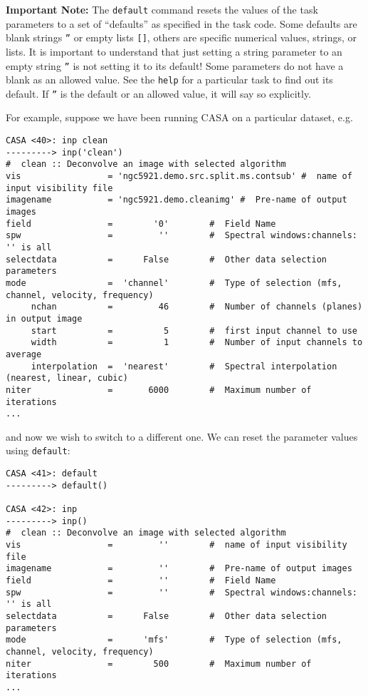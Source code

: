 {\bf Important Note:} The {\tt default} command resets the values
of the task parameters to a set of ``defaults'' as specified in
the task code.  Some defaults are blank strings {\tt ''} or 
empty lists {\tt []}, others are specific numerical values, strings,
or lists.  It is important to understand that just setting a string
parameter to an empty string {\tt ''} is not setting it to its 
default!  Some parameters do not have a blank as an allowed value.
See the {\tt help} for a particular task to find out its default.
If {\tt ''} is the default or an allowed value, it will say so
explicitly.

For example, suppose we have been running CASA on a particular
dataset, e.g.
\small
\begin{verbatim}
CASA <40>: inp clean
---------> inp('clean')
#  clean :: Deconvolve an image with selected algorithm
vis                 = 'ngc5921.demo.src.split.ms.contsub' #  name of input visibility file
imagename           = 'ngc5921.demo.cleanimg' #  Pre-name of output images
field               =        '0'        #  Field Name
spw                 =         ''        #  Spectral windows:channels: '' is all
selectdata          =      False        #  Other data selection parameters
mode                =  'channel'        #  Type of selection (mfs, channel, velocity, frequency)
     nchan          =         46        #  Number of channels (planes) in output image
     start          =          5        #  first input channel to use
     width          =          1        #  Number of input channels to average
     interpolation  =  'nearest'        #  Spectral interpolation (nearest, linear, cubic)
niter               =       6000        #  Maximum number of iterations
...
\end{verbatim}
\normalsize
and now we wish to switch to a different one.  We can reset the
parameter values using {\tt default}:
\small
\begin{verbatim}
CASA <41>: default
---------> default()

CASA <42>: inp
---------> inp()
#  clean :: Deconvolve an image with selected algorithm
vis                 =         ''        #  name of input visibility file
imagename           =         ''        #  Pre-name of output images
field               =         ''        #  Field Name
spw                 =         ''        #  Spectral windows:channels: '' is all
selectdata          =      False        #  Other data selection parameters
mode                =      'mfs'        #  Type of selection (mfs, channel, velocity, frequency)
niter               =        500        #  Maximum number of iterations
...
\end{verbatim}
\normalsize

